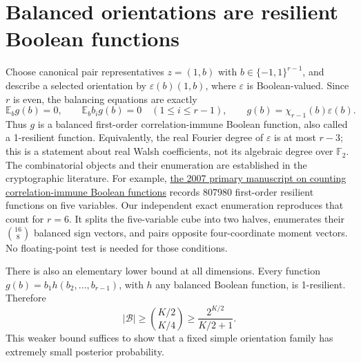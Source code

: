 \documentclass[11pt]{article}
\newcommand{\E}{\mathbb E}\newcommand{\R}{\mathbb R}
\begin{document}
\section{Balanced orientations are resilient Boolean functions}
Choose canonical pair representatives $z=(1,b)$ with
$b\in\{-1,1\}^{r-1}$, and describe a selected orientation by
$\varepsilon(b)(1,b)$, where $\varepsilon$ is Boolean-valued.
Since $r$ is even, the balancing equations are exactly
\[
 \E_b g(b)=0,\qquad \E_b b_i g(b)=0\quad(1\le i\le r-1),
 \qquad g(b)=\chi_{r-1}(b)\varepsilon(b).
\]
Thus $g$ is a balanced first-order correlation-immune Boolean function,
also called a 1-resilient function. Equivalently, the real Fourier degree
of $\varepsilon$ is at most $r-3$; this is a statement about real Walsh
coefficients, not its algebraic degree over $\mathbb F_2$.
The combinatorial objects and their enumeration are established in the
cryptographic literature. For example,
\href{https://research.cs.wisc.edu/techreports/2007/TR1616.pdf}{the 2007
primary manuscript on counting correlation-immune Boolean functions}
records 807980 first-order resilient functions on five variables.
Our independent exact enumeration reproduces that count for $r=6$.
It splits the five-variable cube into two halves, enumerates their
$\binom{16}{8}$ balanced sign vectors, and pairs opposite four-coordinate
moment vectors. No floating-point test is needed for those conditions.

There is also an elementary lower bound at all dimensions. Every function
$g(b)=b_1h(b_2,\ldots,b_{r-1})$, with $h$ any balanced Boolean function,
is 1-resilient. Therefore
\[
 |\mathcal B|\ge\binom{K/2}{K/4}
                 \ge\frac{2^{K/2}}{K/2+1}.\tag{11}
\]
This weaker bound suffices to show that a fixed simple orientation family
has extremely small posterior probability.
\end{document}
